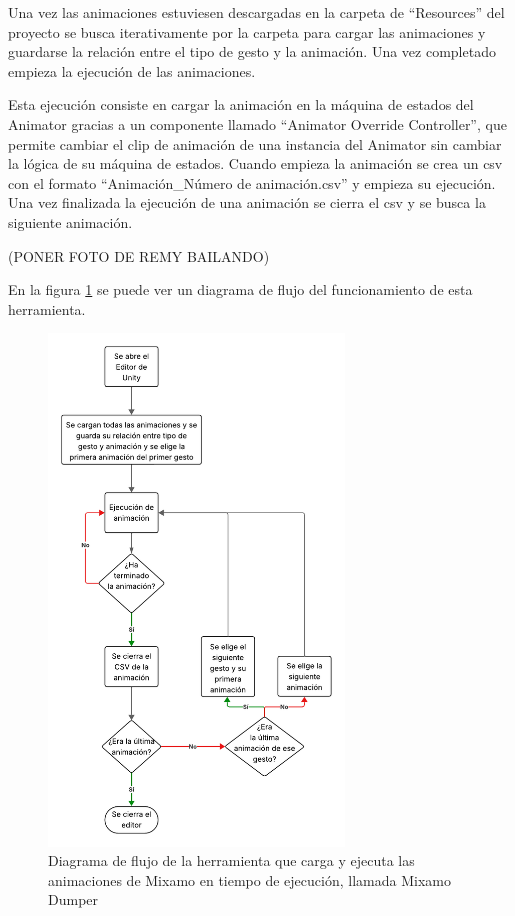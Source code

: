 Una vez las animaciones estuviesen descargadas en la carpeta de ``Resources'' del proyecto se busca iterativamente por la carpeta para cargar las animaciones y guardarse la relación entre el tipo de gesto y la animación.
Una vez completado empieza la ejecución de las animaciones.

Esta ejecución consiste en cargar la animación en la máquina de estados del \gls{Animator} gracias a un componente llamado ``Animator Override Controller'', que permite cambiar el clip de animación de una instancia del \gls{Animator} sin cambiar la lógica de su máquina de estados.
Cuando empieza la animación se crea un \gls{csv} con el formato ``Animación\_Número de animación.csv'' y empieza su ejecución.
Una vez finalizada la ejecución de una animación se cierra el \gls{csv} y se busca la siguiente animación.

(PONER FOTO DE REMY BAILANDO)

En la figura \ref{fig:MixamoDumper} se puede ver un diagrama de flujo del funcionamiento de esta herramienta.

\begin{figure}[H]
    \centering
    \includegraphics[width=0.7\textwidth]{Imagenes/Vectorial/FlujoMixamoDumper.pdf}
    \caption{Diagrama de flujo de la herramienta que carga y ejecuta las animaciones de Mixamo en tiempo de ejecución, llamada Mixamo Dumper}
    \label{fig:MixamoDumper}
\end{figure}

